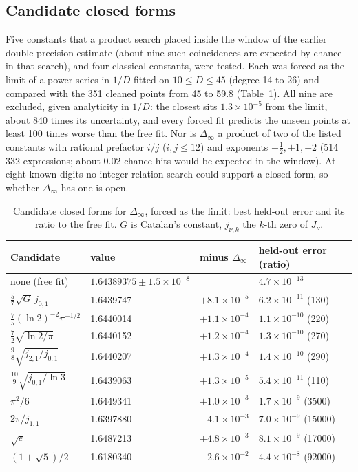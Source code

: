 \documentclass[aps,prd,onecolumn,superscriptaddress,nofootinbib,10pt]{revtex4-2}
\newcommand{\Dinf}{\Delta_\infty}
\begin{document}
\subsection{Candidate closed forms}

Five constants that a product search placed inside the window of the earlier double-precision estimate (about nine
such coincidences are expected by chance in that search), and four classical constants, were tested. Each was forced as
the limit of a power series in $1/D$ fitted on $10 \le D \le 45$ (degree 14 to 26) and compared with the 351 cleaned
points from 45 to 59.8 (Table~\ref{tab:cand}). All nine are excluded, given analyticity in $1/D$: the closest sits
$1.3\times10^{-5}$ from the limit, about 840 times its uncertainty, and every forced fit predicts the unseen points at
least 100 times worse than the free fit. Nor is $\Dinf$ a product of two of the listed constants with rational prefactor
$i/j$ ($i, j \le 12$) and exponents $\pm\tfrac12, \pm1, \pm2$ (514\,332 expressions; about 0.02 chance hits would be expected
in the window). At eight known digits no integer-relation search could support a closed form, so whether $\Dinf$ has
one is open.

\begin{table}[t]
\caption{Candidate closed forms for $\Dinf$, forced as the limit: best held-out error and its ratio to the free fit.
$G$ is Catalan's constant, $j_{\nu,k}$ the $k$-th zero of $J_\nu$.}
\label{tab:cand}
\small
\begin{ruledtabular}
\begin{tabular}{llll}
Candidate & value & minus $\Dinf$ & held-out error (ratio) \\ \hline
none (free fit) & $1.64389375 \pm 1.5\times10^{-8}$ & & $4.7\times10^{-13}$ \\
$\tfrac57\sqrt{G}\,j_{0,1}$ & 1.6439747 & $+8.1\times10^{-5}$ & $6.2\times10^{-11}$ (130) \\
$\tfrac75(\ln2)^{-2}\pi^{-1/2}$ & 1.6440014 & $+1.1\times10^{-4}$ & $1.1\times10^{-10}$ (220) \\
$\tfrac72\sqrt{\ln2/\pi}$ & 1.6440152 & $+1.2\times10^{-4}$ & $1.3\times10^{-10}$ (270) \\
$\tfrac98\sqrt{j_{2,1}/j_{0,1}}$ & 1.6440207 & $+1.3\times10^{-4}$ & $1.4\times10^{-10}$ (290) \\
$\tfrac{10}{9}\sqrt{j_{0,1}/\ln3}$ & 1.6439063 & $+1.3\times10^{-5}$ & $5.4\times10^{-11}$ (110) \\
$\pi^2/6$ & 1.6449341 & $+1.0\times10^{-3}$ & $1.7\times10^{-9}$ (3500) \\
$2\pi/j_{1,1}$ & 1.6397880 & $-4.1\times10^{-3}$ & $7.0\times10^{-9}$ (15000) \\
$\sqrt e$ & 1.6487213 & $+4.8\times10^{-3}$ & $8.1\times10^{-9}$ (17000) \\
$(1+\sqrt5)/2$ & 1.6180340 & $-2.6\times10^{-2}$ & $4.4\times10^{-8}$ (92000) \\
\end{tabular}
\end{ruledtabular}
\end{table}
\end{document}
